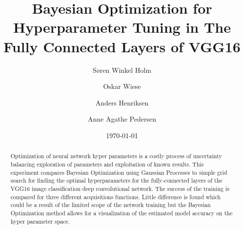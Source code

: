 \documentclass[12pt,fleqn]{article}
\title{\vspace*{-3.5cm}Bayesian Optimization for Hyperparameter Tuning in The Fully Connected Layers of VGG16}
\author{Søren Winkel Holm\and Oskar Wiese\and Anders Henriksen\and Anne Agathe Pedersen}
\date{\today}
\begin{document}
\maketitle


\begin{abstract}
\noindent Optimization of neural network hyper parameters is a costly process of uncertainty balancing exploration of parameters and exploitation of known results. This experiment compares Bayesian Optimization using Gaussian Processes to  simple grid search for finding the optimal hyperparameters for the fully-connected layers of the VGG16 image classification deep convolutional network. The success of the training is compared for three different acquisitions functions. Little difference is found which could be a result of the limited scope of the network training but the Bayesian Optimization method allows for a visualization of the estimated model accuracy on the hyper parameter space.

\end{abstract}
\end{document}
